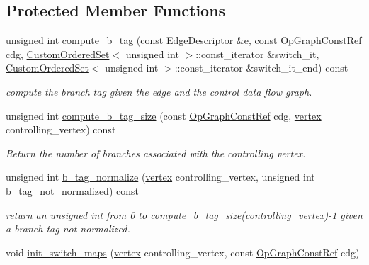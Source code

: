 \subsection*{Protected Member Functions}
\begin{DoxyCompactItemize}
\item 
unsigned int \hyperlink{classScheduling_a9867cf2c93812bdbbd8e25fb02714c15}{compute\+\_\+b\+\_\+tag} (const \hyperlink{graph_8hpp_a9eb9afea34e09f484b21f2efd263dd48}{Edge\+Descriptor} \&e, const \hyperlink{op__graph_8hpp_a9a0b240622c47584bee6951a6f5de746}{Op\+Graph\+Const\+Ref} cdg, \hyperlink{classCustomOrderedSet}{Custom\+Ordered\+Set}$<$ unsigned int $>$\+::const\+\_\+iterator \&switch\+\_\+it, \hyperlink{classCustomOrderedSet}{Custom\+Ordered\+Set}$<$ unsigned int $>$\+::const\+\_\+iterator \&switch\+\_\+it\+\_\+end) const
\begin{DoxyCompactList}\small\item\em compute the branch tag given the edge and the control data flow graph. \end{DoxyCompactList}\item 
unsigned int \hyperlink{classScheduling_a3c6464c39018d94bb1965966a8b8581f}{compute\+\_\+b\+\_\+tag\+\_\+size} (const \hyperlink{op__graph_8hpp_a9a0b240622c47584bee6951a6f5de746}{Op\+Graph\+Const\+Ref} cdg, \hyperlink{graph_8hpp_abefdcf0544e601805af44eca032cca14}{vertex} controlling\+\_\+vertex) const
\begin{DoxyCompactList}\small\item\em Return the number of branches associated with the controlling vertex. \end{DoxyCompactList}\item 
unsigned int \hyperlink{classScheduling_a785e18cb44b1a3daff11da1ea6b72fb6}{b\+\_\+tag\+\_\+normalize} (\hyperlink{graph_8hpp_abefdcf0544e601805af44eca032cca14}{vertex} controlling\+\_\+vertex, unsigned int b\+\_\+tag\+\_\+not\+\_\+normalized) const
\begin{DoxyCompactList}\small\item\em return an unsigned int from 0 to compute\+\_\+b\+\_\+tag\+\_\+size(controlling\+\_\+vertex)-\/1 given a branch tag not normalized. \end{DoxyCompactList}\item 
void \hyperlink{classScheduling_a5e00e09071613f56a5542b3c3636b71e}{init\+\_\+switch\+\_\+maps} (\hyperlink{graph_8hpp_abefdcf0544e601805af44eca032cca14}{vertex} controlling\+\_\+vertex, const \hyperlink{op__graph_8hpp_a9a0b240622c47584bee6951a6f5de746}{Op\+Graph\+Const\+Ref} cdg)

\end{DoxyCompactItemize}
